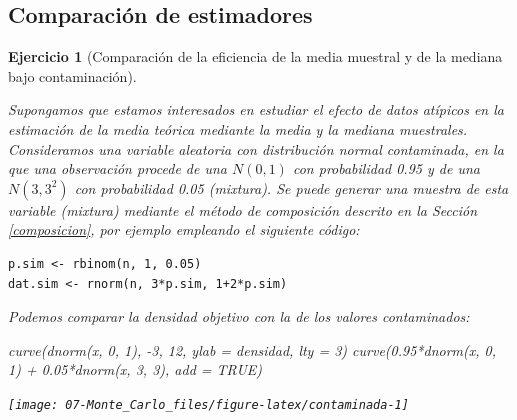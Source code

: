 \documentclass[
  10pt,
]{book}
\newenvironment{Shaded}{\begin{snugshade}}{\end{snugshade}}
\newcommand{\AttributeTok}[1]{\textcolor[rgb]{0.77,0.63,0.00}{#1}}
\newcommand{\ConstantTok}[1]{\textcolor[rgb]{0.00,0.00,0.00}{#1}}
\newcommand{\DecValTok}[1]{\textcolor[rgb]{0.00,0.00,0.81}{#1}}
\newcommand{\FloatTok}[1]{\textcolor[rgb]{0.00,0.00,0.81}{#1}}
\newcommand{\FunctionTok}[1]{\textcolor[rgb]{0.00,0.00,0.00}{#1}}
\newcommand{\NormalTok}[1]{#1}
\newcommand{\SpecialCharTok}[1]{\textcolor[rgb]{0.00,0.00,0.00}{#1}}
\newcommand{\StringTok}[1]{\textcolor[rgb]{0.31,0.60,0.02}{#1}}
\theoremstyle{break}
\newtheorem{exercise}{Ejercicio}[chapter]
\theoremstyle{nonumberplain}
\begin{document}
\hypertarget{comparaciuxf3n-de-estimadores}{%
\subsection{Comparación de estimadores}\label{comparaciuxf3n-de-estimadores}}

\begin{exercise}[Comparación de la eficiencia de la media muestral y de la mediana bajo contaminación]
\protect\hypertarget{exr:media-median}{}\label{exr:media-median}

Supongamos que estamos interesados en estudiar el efecto de datos atípicos en la estimación de la media teórica mediante la media y la mediana muestrales.
Consideramos una variable aleatoria con distribución normal contaminada, en la que una observación procede de una \(N(0,1)\) con probabilidad 0.95 y de una \(N(3,3^2)\) con probabilidad 0.05 (mixtura).
Se puede generar una muestra de esta variable (mixtura) mediante el método de composición descrito en la Sección \ref{composicion}, por ejemplo empleando el siguiente código:

\begin{verbatim}
p.sim <- rbinom(n, 1, 0.05)
dat.sim <- rnorm(n, 3*p.sim, 1+2*p.sim)
\end{verbatim}

Podemos comparar la densidad objetivo con la de los valores contaminados:

\begin{Shaded}
\begin{Highlighting}[]
\FunctionTok{curve}\NormalTok{(}\FunctionTok{dnorm}\NormalTok{(x, }\DecValTok{0}\NormalTok{, }\DecValTok{1}\NormalTok{), }\SpecialCharTok{{-}}\DecValTok{3}\NormalTok{, }\DecValTok{12}\NormalTok{, }\AttributeTok{ylab =} \StringTok{\textquotesingle{}densidad\textquotesingle{}}\NormalTok{, }\AttributeTok{lty =} \DecValTok{3}\NormalTok{)}
\FunctionTok{curve}\NormalTok{(}\FloatTok{0.95}\SpecialCharTok{*}\FunctionTok{dnorm}\NormalTok{(x, }\DecValTok{0}\NormalTok{, }\DecValTok{1}\NormalTok{) }\SpecialCharTok{+} \FloatTok{0.05}\SpecialCharTok{*}\FunctionTok{dnorm}\NormalTok{(x, }\DecValTok{3}\NormalTok{, }\DecValTok{3}\NormalTok{), }\AttributeTok{add =} \ConstantTok{TRUE}\NormalTok{)}
\end{Highlighting}
\end{Shaded}

\begin{center}\texttt{[image: 07-Monte\_Carlo\_files/figure-latex/contaminada-1]} \end{center}

\end{exercise}
\end{document}
